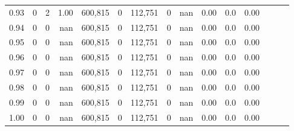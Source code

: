 \begin{tabular}{rrrrrrrrrrrrrrr}
0.93 &       0 &      2 &  1.00 &  600,815 &        0 &  112,751 &        0 &   nan &  0.00 &                     0.0 &      0.00 \\
0.94 &       0 &      0 &   nan &  600,815 &        0 &  112,751 &        0 &   nan &  0.00 &                     0.0 &      0.00 \\
0.95 &       0 &      0 &   nan &  600,815 &        0 &  112,751 &        0 &   nan &  0.00 &                     0.0 &      0.00 \\
0.96 &       0 &      0 &   nan &  600,815 &        0 &  112,751 &        0 &   nan &  0.00 &                     0.0 &      0.00 \\
0.97 &       0 &      0 &   nan &  600,815 &        0 &  112,751 &        0 &   nan &  0.00 &                     0.0 &      0.00 \\
0.98 &       0 &      0 &   nan &  600,815 &        0 &  112,751 &        0 &   nan &  0.00 &                     0.0 &      0.00 \\
0.99 &       0 &      0 &   nan &  600,815 &        0 &  112,751 &        0 &   nan &  0.00 &                     0.0 &      0.00 \\
1.00 &       0 &      0 &   nan &  600,815 &        0 &  112,751 &        0 &   nan &  0.00 &                     0.0 &      0.00 \\
\bottomrule
\end{tabular}
